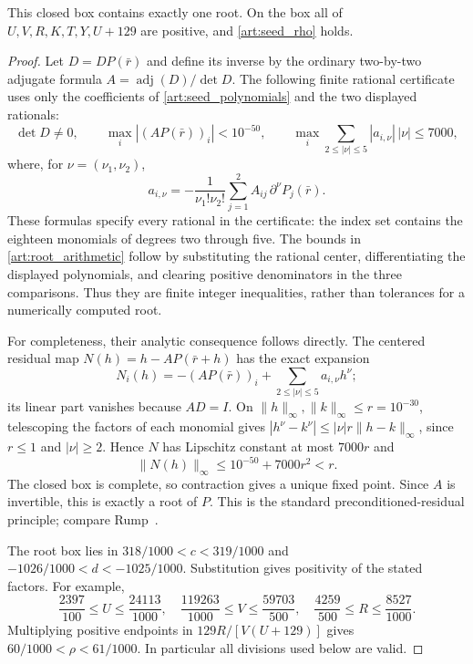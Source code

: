 \begin{lemma}\label{art:root_certificate}
This closed box contains exactly one root. On the box all of
$U,V,R,K,T,Y,U+129$ are positive, and \eqref{art:seed_rho} holds.
\end{lemma}
\begin{proof}
Let $D=DP(\bar r)$ and define its inverse by the ordinary two-by-two
adjugate formula $A=\operatorname{adj}(D)/\det D$.
The following finite rational certificate uses only the coefficients of
\eqref{art:seed_polynomials} and the two displayed rationals:
\begin{equation}\label{art:root_arithmetic}
 \det D\ne0,\qquad
 \max_i |(AP(\bar r))_i|<10^{-50},\qquad
 \max_i\sum_{2\le|\nu|\le5}|a_{i,\nu}|\,|\nu|\le7000,
\end{equation}
where, for $\nu=(\nu_1,\nu_2)$,
\[
 a_{i,\nu}=-\frac{1}{\nu_1!\nu_2!}
     \sum_{j=1}^2 A_{ij}\,\partial^\nu P_j(\bar r).
\]
These formulas specify every rational in the certificate: the index set
contains the eighteen monomials of degrees two through five. The bounds
in \eqref{art:root_arithmetic} follow by substituting the rational center,
differentiating the displayed polynomials, and clearing positive
denominators in the three comparisons. Thus they are finite integer
inequalities, rather than tolerances for a numerically computed root.

For completeness, their analytic consequence follows directly.
The centered residual map $N(h)=h-AP(\bar r+h)$ has the exact expansion
\[
 N_i(h)=-(AP(\bar r))_i+
           \sum_{2\le|\nu|\le5}a_{i,\nu}h^\nu;
\]
its linear part vanishes because $AD=I$.
On $\|h\|_\infty,\|k\|_\infty\le r=10^{-30}$, telescoping the
factors of each monomial gives
$|h^\nu-k^\nu|\le|\nu|r\|h-k\|_\infty$, since $r\le1$ and
$|\nu|\ge2$. Hence $N$ has Lipschitz constant at most $7000r$ and
\[
 \|N(h)\|_\infty\le10^{-50}+7000r^2<r.
\]
The closed box is complete, so contraction gives a unique fixed point.
Since $A$ is invertible, this is exactly a root of $P$.
This is the standard preconditioned-residual principle; compare
Rump~\cite[Theorem~13.3]{NEG_RUMP10}.

The root box lies in
$318/1000<c<319/1000$ and $-1026/1000<d<-1025/1000$.
Substitution gives positivity of the stated factors. For example,
\[
 \frac{2397}{100}\le U\le\frac{24113}{1000},\quad
 \frac{119263}{1000}\le V\le\frac{59703}{500},\quad
 \frac{4259}{500}\le R\le\frac{8527}{1000}.
\]
Multiplying positive endpoints in $129R/[V(U+129)]$ gives
$60/1000<\rho<61/1000$. In particular all divisions used below are valid.
\end{proof}

